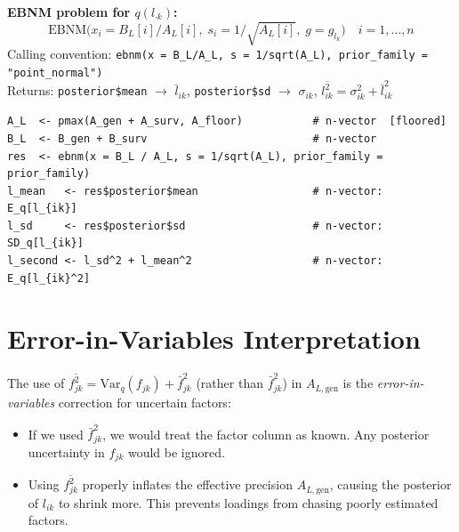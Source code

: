 \documentclass[11pt]{article}
\newcommand{\fbar}[2]{\bar{f}_{#1#2}}
\newcommand{\fsec}[2]{\overline{f^2_{#1#2}}}
\begin{document}
\begin{ebnmbox}
\textbf{EBNM problem for $q(l_{\cdot k})$:}
\begin{equation}
  \mathrm{EBNM}\bigl(x_i = B_L[i]/A_L[i],\; s_i = 1/\sqrt{A_L[i]},\;
    g = g_{l_k}\bigr)
  \quad i = 1,\ldots,n
  \label{eq:ebnm}
\end{equation}
Calling convention: \texttt{ebnm(x = B\_L/A\_L, s = 1/sqrt(A\_L), prior\_family = "point\_normal")}\\
Returns: \texttt{posterior\$mean} $\to$ $\bar{l}_{ik}$,\quad
\texttt{posterior\$sd} $\to$ $\sigma_{ik}$,\quad
$\overline{l^2_{ik}} = \sigma_{ik}^2 + \bar{l}_{ik}^2$
\end{ebnmbox}

\begin{codebox}
\begin{verbatim}
A_L  <- pmax(A_gen + A_surv, A_floor)           # n-vector  [floored]
B_L  <- B_gen + B_surv                          # n-vector
res  <- ebnm(x = B_L / A_L, s = 1/sqrt(A_L), prior_family = prior_family)
l_mean   <- res$posterior$mean                  # n-vector: E_q[l_{ik}]
l_sd     <- res$posterior$sd                    # n-vector: SD_q[l_{ik}]
l_second <- l_sd^2 + l_mean^2                   # n-vector: E_q[l_{ik}^2]
\end{verbatim}
\end{codebox}

\section{Error-in-Variables Interpretation}\label{sec:eiv}

The use of $\fsec{j}{k} = \mathrm{Var}_q(f_{jk}) + \fbar{j}{k}^2$ (rather
than $\fbar{j}{k}^2$) in $A_{L,\text{gen}}$ is the \emph{error-in-variables}
correction for uncertain factors:

\begin{itemize}
  \item If we used $\fbar{j}{k}^2$, we would treat the factor column as
    known.  Any posterior uncertainty in $f_{jk}$ would be ignored.
  \item Using $\fsec{j}{k}$ properly inflates the effective precision
    $A_{L,\text{gen}}$, causing the posterior of $l_{ik}$ to shrink more.
    This prevents loadings from chasing poorly estimated factors.
\end{itemize}
\end{document}
